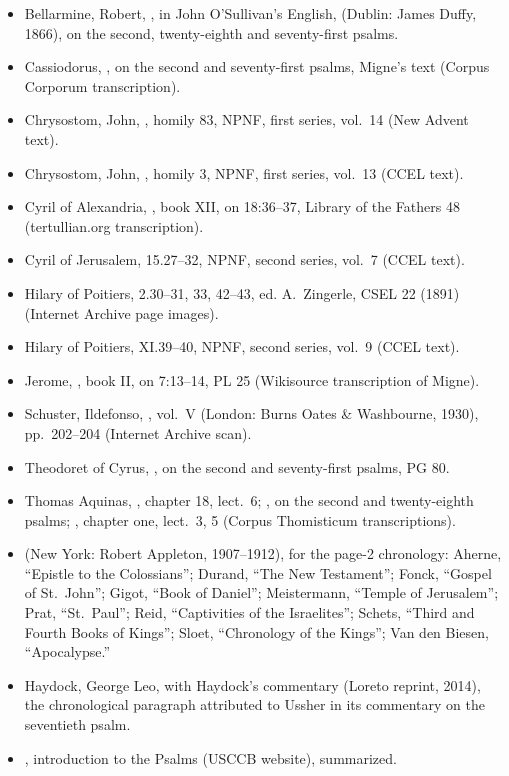{\begin{itemize}[leftmargin=1.2em,itemsep=.15em]
(Internet Archive OCR).
\item Bellarmine, Robert, , in John O'Sullivan's
English,  (Dublin: James Duffy, 1866),
on the second, twenty-eighth and seventy-first psalms.
\item Cassiodorus, , on the second and seventy-first
psalms, Migne's text (Corpus Corporum transcription).
\item Chrysostom, John, , homily 83, NPNF, first series,
vol.~14 (New Advent text).
\item Chrysostom, John, , homily 3, NPNF, first
series, vol.~13 (CCEL text).
\item Cyril of Alexandria, , book XII, on 18:36--37,
Library of the Fathers 48 (tertullian.org transcription).
\item Cyril of Jerusalem,  15.27--32, NPNF, second
series, vol.~7 (CCEL text).
\item Hilary of Poitiers,  2.30--31, 33,
42--43, ed. A.~Zingerle, CSEL 22 (1891) (Internet Archive page images).
\item Hilary of Poitiers,  XI.39--40, NPNF, second series,
vol.~9 (CCEL text).
\item Jerome, , book II, on 7:13--14, PL 25
(Wikisource transcription of Migne).
\item Schuster, Ildefonso, ,
vol.~V (London: Burns Oates \& Washbourne, 1930), pp.~202--204 (Internet
Archive scan).
\item Theodoret of Cyrus, , on the second and
seventy-first psalms, PG 80.
\item Thomas Aquinas, , chapter 18,
lect.~6; , on the second and twenty-eighth
psalms; , chapter one,
lect.~3, 5 (Corpus Thomisticum transcriptions).
\item {} (New York: Robert Appleton, 1907--1912),
for the page-2 chronology: Aherne, ``Epistle to the Colossians''; Durand,
``The New Testament''; Fonck, ``Gospel of St.~John''; Gigot, ``Book of
Daniel''; Meistermann, ``Temple of Jerusalem''; Prat, ``St.~Paul''; Reid,
``Captivities of the Israelites''; Schets, ``Third and Fourth Books of
Kings''; Sloet, ``Chronology of the Kings''; Van den Biesen, ``Apocalypse.''
\item Haydock, George Leo,  with Haydock's commentary
(Loreto reprint, 2014), the chronological paragraph attributed to Ussher in
its commentary on the seventieth psalm.
\item {}, introduction to the Psalms
(USCCB website), summarized.
\end{itemize}
\par}
